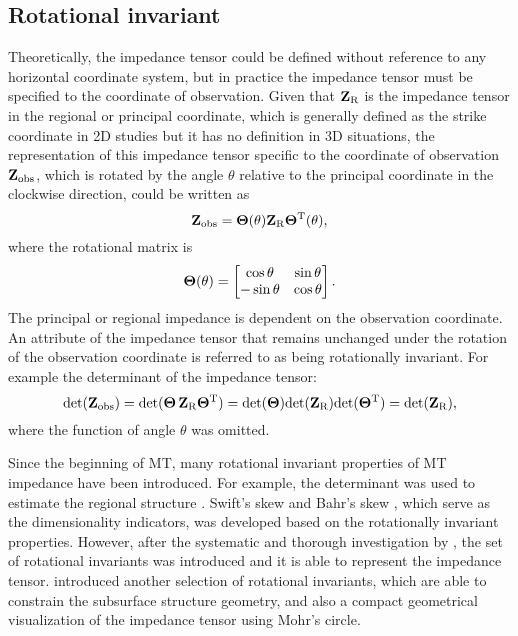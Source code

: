  \subsection*{\hspace{20mm}Rotational invariant}
	 Theoretically, the impedance tensor could be defined without reference to any horizontal coordinate system, but in practice the impedance tensor must be specified to the coordinate of observation.
	 Given that $\mathbf{Z}_{\text{R}}$ is the impedance tensor in the regional or principal coordinate, 
	 which is generally defined as the strike coordinate in 2D studies but it has no definition in 3D situations,
	  the representation of this impedance tensor specific to the coordinate of observation $\mathbf{Z}_\text{obs}$, which is rotated by the angle $\theta$ relative to the principal coordinate in the clockwise direction, could be written as
			\begin{equation}
				\mathbf{Z}_\text{obs} = \mathbf{\Theta}(\theta)\mathbf{Z}_{\text{R}}{\mathbf{\Theta}}^\text{T}(\theta),
			\end{equation}
			where the rotational matrix is
			\begin{equation}
				\mathbf{\Theta}(\theta) = \begin{bmatrix} \cos \theta & \sin \theta \\ -\sin \theta & \cos \theta \end{bmatrix}.
			\end{equation}
			The principal or regional impedance is dependent on the observation coordinate. An attribute of the impedance tensor that remains unchanged under the rotation of the observation coordinate is referred to as being rotationally invariant. For example the determinant of the impedance tensor:
		\begin{equation*}
			\mathrm{det}(\mathbf{Z}_\text{obs}) = \mathrm{det}( \mathbf{\Theta}\,\mathbf{Z}_{\text{R}} {\mathbf{\Theta}}^\text{T} ) = \mathrm{det}(\mathbf{\Theta}) \mathrm{det}(\mathbf{Z}_{\text{R}}) \mathrm{det}({\mathbf{\Theta}}^\text{T}) = \mathrm{det}(\mathbf{Z}_{\text{R}}),
		\end{equation*}
where the function of angle $\theta$ was omitted.

		Since the beginning of MT, many rotational invariant properties of MT impedance have been introduced. 
		 For example, the determinant was used to estimate the regional structure \citep[e.g.,][]{berdichevsky1980a}. Swift's skew \citep{swift1967a} and Bahr's skew \citep{bahr1988a}, which serve as the dimensionality indicators, was developed based on the rotationally invariant properties. 
		 However, after the systematic and thorough investigation by \citet{szarka1997a}, the set of rotational invariants was introduced and it is able to represent the impedance tensor.
		 \citet{weaver2000a} introduced another selection of rotational invariants, which are able to constrain the subsurface structure geometry,  and also a compact geometrical visualization of the impedance tensor using Mohr's circle.
	
